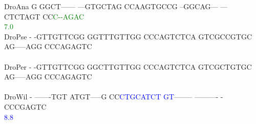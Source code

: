\documentclass[11pt,twoside,reqno,a4paper]{article}
\begin{document}
{DroAna	G	GGCT------	---GTGCTAG	CCAAGTGCCG	--GGCAG---	---CTCTAGT	CC\textcolor{Green}{C}\textcolor{Green}{-}\textcolor{Green}{-}\textcolor{Green}{A}\textcolor{Green}{G}\textcolor{Green}{A}\textcolor{Green}{C}\\
\hspace*{7\charwidth}\hspace*{1\charwidth}\hspace*{1\charwidth}\hspace*{1\charwidth}\hspace*{1\charwidth}\hspace*{1\charwidth}\hspace*{1\charwidth}\hspace*{53\charwidth}\textcolor{Green}{7.0}\\
DroPse	-	-GTTGTTCGG	GGTTTGTTGG	CCCAGTCTCA	GTCGCCGTGC	AG-----AGG	CCCAGAGTC\\
\hspace*{7\charwidth}\hspace*{1\charwidth}\hspace*{1\charwidth}\hspace*{1\charwidth}\hspace*{1\charwidth}\hspace*{1\charwidth}\hspace*{1\charwidth}\\
DroPer	-	-GTTGTTCGG	GGCTTGTTGG	CCCAGTCTCA	GTCGCTGTGC	AG-----AGG	CCCAGAGTC\\
\hspace*{7\charwidth}\hspace*{1\charwidth}\hspace*{1\charwidth}\hspace*{1\charwidth}\hspace*{1\charwidth}\hspace*{1\charwidth}\hspace*{1\charwidth}\\
DroWil	-	-------TGT	ATGT-----G	CC\textcolor{Blue}{C}\textcolor{Blue}{T}\textcolor{Blue}{G}\textcolor{Blue}{C}\textcolor{Blue}{A}\textcolor{Blue}{T}\textcolor{Blue}{C}\textcolor{Blue}{T}	\textcolor{Blue}{G}\textcolor{Blue}{T}--------	----------	-CCCGAGTC\\
\hspace*{7\charwidth}\hspace*{1\charwidth}\hspace*{1\charwidth}\hspace*{1\charwidth}\hspace*{23\charwidth}\textcolor{Blue}{8.8}\hspace*{1\charwidth}\hspace*{1\charwidth}\hspace*{1\charwidth}\\
}
\end{document}
